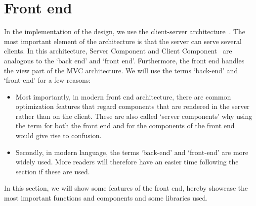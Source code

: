 \section{Front end}\label{sec:front-end}

In the implementation of the design, we use the client-server architecture~\cite{mathiassen2018}.
The most important element of the architecture is that the server can serve several clients.
In this architecture, Server Component and Client Component~\cite{mathiassen2018} are analogous to the `back end' and
`front end'.
Furthermore, the front end handles the view part of the MVC architecture.
We will use the terms `back-end' and `front-end' for a few reasons:

\begin{itemize}
    \item Most importantly, in modern front end architecture, there are common optimization features that regard
    components that are rendered in the server rather than on the client.
    These are also called `server components' why using the term for both the front end and for the components of the
    front end would give rise to confusion.

    \item Secondly, in modern language, the terms `back-end' and `front-end' are more widely used.
    More readers will therefore have an easier time following the section if these are used.
\end{itemize}

In this section, we will show some features of the front end, hereby showcase the most important functions and
components and some libraries used.





